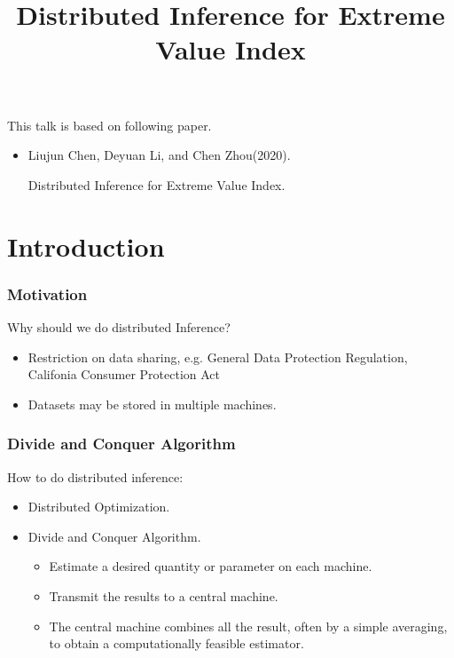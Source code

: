 \documentclass{beamer}
\title{Distributed Inference for Extreme Value Index}
\begin{document}
\begin{frame}
\titlepage
\begin{center}
\end{center}
\end{frame}

\begin{frame}
    \frametitle{}
This talk is based on following paper.
\begin{itemize}
    \item Liujun Chen, Deyuan Li, and Chen Zhou(2020). 
    
    {\color{blue} Distributed Inference for Extreme Value Index.}
\end{itemize}
    

\end{frame}

\section{Introduction}
\begin{frame}
    \frametitle{Motivation}
Why should we do distributed Inference?
\bigskip
\begin{itemize}
    \item Restriction on data sharing, e.g.  General Data Protection Regulation, Califonia Consumer Protection Act
    \bigskip
    \item Datasets may be stored in multiple machines.
\end{itemize}

\end{frame}

\begin{frame}
    \frametitle{Divide and Conquer Algorithm}
How to do distributed inference:
\begin{itemize}
    \item Distributed Optimization. 
    \bigskip
    \item Divide and Conquer Algorithm.
        \begin{itemize}
            \item Estimate a desired quantity or parameter on each machine.

            \item Transmit the results to a central machine.
            \item The central machine combines all the result, often by a simple averaging, to obtain a computationally feasible estimator. 
        \end{itemize}
\end{itemize}
    

\end{frame}
\end{document}
